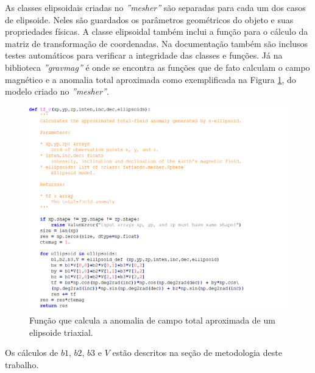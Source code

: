 As classes elipsoidais criadas no \textit{''mesher''} são separadas para cada um dos casos de elipsoide. Neles são guardados os parâmetros geométricos do objeto e suas propriedades físicas. A classe elipsoidal também inclui a função para o cálculo da matriz de transformação de coordenadas. Na documentação também são inclusos testes automáticos para verificar a integridade das classes e funções. Já na biblioteca \textit{''gravmag''} é onde se encontra as funções que de fato calculam o campo magnético e a anomalia total aproximada como exemplificada na Figura \ref{fig:func_triaxial}, do modelo criado no \textit{''mesher''}.
\begin{figure}[hbt!]
	\centering \includegraphics[width=16 cm,height=16 cm]{figures/func_triaxial}
	\caption[Função que calcula a anomalia de campo total aproximada de um elipsoide triaxial.]{Função que calcula a anomalia de campo total aproximada de um elipsoide triaxial.}
	\label{fig:func_triaxial}
\end{figure}

Os cálculos de $b1$, $b2$, $b3$ e $V$ estão descritos na seção de metodologia deste trabalho.

